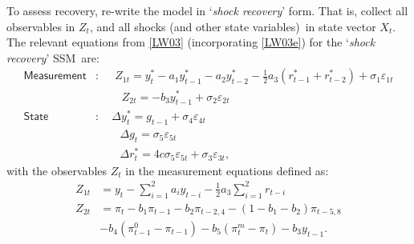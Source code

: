 \documentclass[a4paper,12pt]{article}
\newcommand{\bsq}{\begin{subequations}}\newcommand{\esq}{\end{subequations}}
\newcommand{\vsp}[1]{\vspace*{#1mm}}\newcommand{\hsp}[1]{\hspace*{#1mm}}  }
\begin{document}
To assess recovery, re-write the model in `\emph{shock recovery}' form. That
is, collect all observables in $Z_{t}$, and all shocks (and other state
variables)\ in state vector $X_{t}$. The relevant equations from \ref{LW03}
(incorporating \ref{LW03e}) for the `\emph{shock recovery}' SSM\ are:\bsq%
\label{ssm0}%
\begin{align}
\mathsf{Measurement}& :\;\quad Z_{1t}=y_{t}^{\ast }-a_{1}y_{t-1}^{\ast
}-a_{2}y_{t-2}^{\ast }-\tfrac{1}{2}a_{3}\left( r_{t-1}^{\ast }+r_{t-2}^{\ast
}\right) +\sigma _{1}\varepsilon _{1t} \\
\phantom{\mathsf{Measurement}}& \,\,\;\;\phantom{:\quad}%
Z_{2t}=-b_{3}y_{t-1}^{\ast }+\sigma _{2}\varepsilon _{2t} \\
\mathsf{State}& :\quad \Delta y_{t}^{\ast }=g_{t-1}+\sigma _{4}\varepsilon
_{4t} \\
\phantom{\mathsf{State}}& \;\,\;\phantom{:\quad}\Delta g_{t}=\sigma
_{5}\varepsilon _{5t} \\
\phantom{\mathsf{State}}& \;\,\;\phantom{:\quad}\Delta r_{t}^{\ast
}=4c\sigma _{5}\varepsilon _{5t}+\sigma _{3}\varepsilon _{3t},
\end{align}%
\esq with the observables $Z_{t}$ in the measurement equations defined as:%
\vsp{-3}
\begin{align*}
Z_{1t}& =y_{t}-\sum_{i=1}^{2}a_{i}y_{t-i}-\tfrac{1}{2}a_{3}%
\sum_{i=1}^{2}r_{t-i} \\
Z_{2t}& =\pi _{t}-b_{1}\pi _{t-1}-b_{2}\pi _{t-2,4}-\left(
1-b_{1}-b_{2}\right) \pi _{t-5,8} \\
& -b_{4}(\pi _{t-1}^{0}-\pi _{t-1})-b_{5}\left( \pi _{t}^{m}-\pi _{t}\right)
-b_{3}y_{t-1}.
\end{align*}
\end{document}
